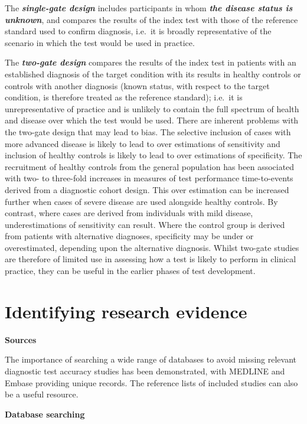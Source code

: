 \documentclass[
  11pt,
  a4paper,
  DIV=11,
  numbers=noendperiod]{scrreprt}
\begin{document}
The \textbf{\emph{single-gate design}} includes participants in whom
\textbf{\emph{the disease status is unknown}}, and compares the results
of the index test with those of the reference standard used to confirm
diagnosis, i.e.~it is broadly representative of the scenario in which
the test would be used in practice.

The \textbf{\emph{two-gate design}} compares the results of the index
test in patients with an established diagnosis of the target condition
with its results in healthy controls or controls with another diagnosis
(known status, with respect to the target condition, is therefore
treated as the reference standard); i.e.~it is unrepresentative of
practice and is unlikely to contain the full spectrum of health and
disease over which the test would be used. There are inherent problems
with the two-gate design that may lead to bias. The selective inclusion
of cases with more advanced disease is likely to lead to over
estimations of sensitivity and inclusion of healthy controls is likely
to lead to over estimations of specificity. The recruitment of healthy
controls from the general population has been associated with two- to
three-fold increases in measures of test performance time-to-events
derived from a diagnostic cohort design. This over estimation can be
increased further when cases of severe disease are used alongside
healthy controls. By contrast, where cases are derived from individuals
with mild disease, underestimations of sensitivity can result. Where the
control group is derived from patients with alternative diagnoses,
specificity may be under or overestimated, depending upon the
alternative diagnosis. Whilst two-gate studies are therefore of limited
use in assessing how a test is likely to perform in clinical practice,
they can be useful in the earlier phases of test development.

\section{Identifying research
evidence}\label{identifying-research-evidence-1}

\textbf{Sources}

The importance of searching a wide range of databases to avoid missing
relevant diagnostic test accuracy studies has been demonstrated, with
MEDLINE and Embase providing unique records. The reference lists of
included studies can also be a useful resource.

\textbf{Database searching}
\end{document}
